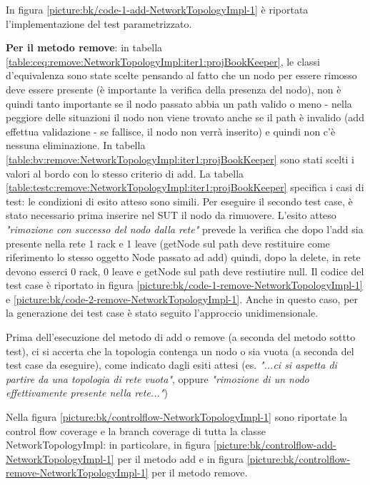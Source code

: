 \documentclass[10pt, a4paper]{article}
\newcommand{\gettablelabel}[5]{table:#1:#2:#3:iter#4:proj#5}
\newcommand{\getpicturelabel}[1]{picture:#1}
\def\bookkeeper{BookKeeper}
\begin{document}
	In figura \ref{\getpicturelabel{bk/code-1-add-NetworkTopologyImpl-1}} è riportata l'implementazione del
	test parametrizzato.
	
	\textbf{Per il metodo remove}: in tabella \ref{\gettablelabel{ceq}{remove}{NetworkTopologyImpl}{1}
	{\bookkeeper}}, le classi d'equivalenza sono state scelte pensando al fatto che un nodo per essere
	rimosso deve essere presente (è importante la verifica della presenza del nodo), non è quindi tanto 
	importante se il nodo passato abbia un path valido
	o meno - nella peggiore delle situazioni il nodo non viene trovato anche se il path è invalido (add 
	effettua validazione - se fallisce, il nodo non verrà inserito) e quindi non c'è nessuna 
	eliminazione.
	In tabella \ref{\gettablelabel{bv}{remove}{NetworkTopologyImpl}{1}{\bookkeeper}} sono stati scelti i valori al
	bordo con lo stesso criterio di add.
	La tabella \ref{\gettablelabel{testc}{remove}{NetworkTopologyImpl}{1}{\bookkeeper}} specifica i casi di test:
	le condizioni di esito atteso sono simili. Per eseguire il secondo test case, è stato necessario
	prima inserire nel SUT il nodo da rimuovere. L'esito atteso \textit{"rimozione con successo
	del nodo dalla rete"} prevede la verifica che dopo l'add sia presente nella rete 1 rack e 1 leave 
	(getNode sul path deve restituire come riferimento lo stesso oggetto Node passato ad add)
	quindi, dopo la delete, in rete devono esserci 0 rack, 0 leave e getNode sul path deve restiutire 
	null. Il codice del test case è riportato in figura \ref{\getpicturelabel{bk/code-1-remove-NetworkTopologyImpl-1}}
	e \ref{\getpicturelabel{bk/code-2-remove-NetworkTopologyImpl-1}}. Anche in questo caso, per la
	generazione dei test case è stato seguito l'approccio unidimensionale.
	
	Prima dell'esecuzione del metodo di add o remove (a seconda del metodo sottto test), ci si accerta 	
	che la topologia contenga un nodo o sia vuota (a seconda del test case da eseguire), come indicato
	dagli esiti attesi (es. \textit{"...ci si aspetta di partire da una topologia di rete vuota"}, 
	oppure \textit{"rimozione di un nodo effettivamente presente nella rete..."})
		
	Nella figura \ref{\getpicturelabel{bk/controlflow-NetworkTopologyImpl-1}} sono riportate la
	control flow coverage e la branch coverage di tutta la classe NetworkTopologyImpl: in particolare,
	in figura \ref{\getpicturelabel{bk/controlflow-add-NetworkTopologyImpl-1}} per il metodo add e in
	figura \ref{\getpicturelabel{bk/controlflow-remove-NetworkTopologyImpl-1}} per il metodo remove.
	
\end{document}

